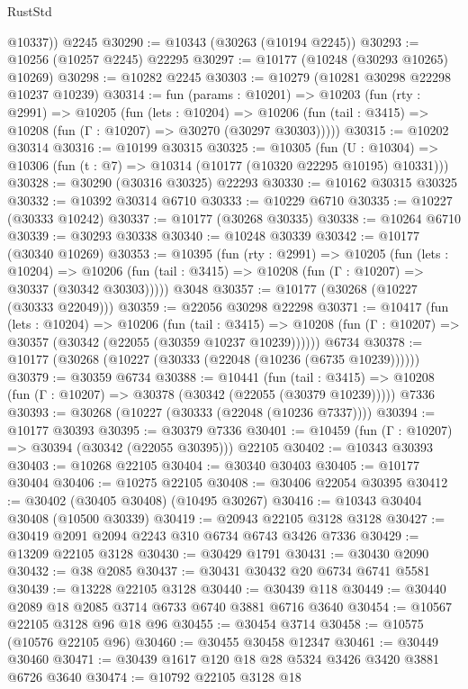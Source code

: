 \begin{lexlean}{RustStd}
\begin{coremodule}
        @10337))
    @2245
@30290 := @10343 (@30263 (@10194 @2245))
@30293 := @10256 (@10257 @2245) @22295
@30297 := @10177 (@10248 (@30293 @10265) @10269)
@30298 := @10282 @2245
@30303 := @10279 (@10281 @30298 @22298 @10237 @10239)
@30314 := fun (params : @10201) =>
  @10203
    (fun (rty : @2991) =>
    @10205
      (fun (lets : @10204) =>
      @10206 (fun (tail : @3415) => @10208 (fun (Γ : @10207) => @30270 (@30297 @30303)))))
@30315 := @10202 @30314
@30316 := @10199 @30315
@30325 := @10305
    (fun (U : @10304) => @10306 (fun (t : @7) => @10314 (@10177 (@10320 @22295 @10195) @10331)))
@30328 := @30290 (@30316 @30325) @22293
@30330 := @10162 @30315 @30325
@30332 := @10392 @30314 @6710
@30333 := @10229 @6710
@30335 := @10227 (@30333 @10242)
@30337 := @10177 (@30268 @30335)
@30338 := @10264 @6710
@30339 := @30293 @30338
@30340 := @10248 @30339
@30342 := @10177 (@30340 @10269)
@30353 := @10395
    (fun (rty : @2991) =>
    @10205
      (fun (lets : @10204) =>
      @10206 (fun (tail : @3415) => @10208 (fun (Γ : @10207) => @30337 (@30342 @30303)))))
    @3048
@30357 := @10177 (@30268 (@10227 (@30333 @22049)))
@30359 := @22056 @30298 @22298
@30371 := @10417
    (fun (lets : @10204) =>
    @10206
      (fun (tail : @3415) =>
      @10208 (fun (Γ : @10207) => @30357 (@30342 (@22055 (@30359 @10237 @10239))))))
    @6734
@30378 := @10177 (@30268 (@10227 (@30333 (@22048 (@10236 (@6735 @10239))))))
@30379 := @30359 @6734
@30388 := @10441
    (fun (tail : @3415) => @10208 (fun (Γ : @10207) => @30378 (@30342 (@22055 (@30379 @10239)))))
    @7336
@30393 := @30268 (@10227 (@30333 (@22048 (@10236 @7337))))
@30394 := @10177 @30393
@30395 := @30379 @7336
@30401 := @10459 (fun (Γ : @10207) => @30394 (@30342 (@22055 @30395))) @22105
@30402 := @10343 @30393
@30403 := @10268 @22105
@30404 := @30340 @30403
@30405 := @10177 @30404
@30406 := @10275 @22105
@30408 := @30406 @22054 @30395
@30412 := @30402 (@30405 @30408) (@10495 @30267)
@30416 := @10343 @30404 @30408 (@10500 @30339)
@30419 := @20943 @22105 @3128 @3128
@30427 := @30419 @2091 @2094 @2243 @310 @6734 @6743 @3426 @7336
@30429 := @13209 @22105 @3128
@30430 := @30429 @1791
@30431 := @30430 @2090
@30432 := @38 @2085
@30437 := @30431 @30432 @20 @6734 @6741 @5581
@30439 := @13228 @22105 @3128
@30440 := @30439 @118
@30449 := @30440 @2089 @18 @2085 @3714 @6733 @6740 @3881 @6716 @3640
@30454 := @10567 @22105 @3128 @96 @18 @96
@30455 := @30454 @3714
@30458 := @10575 (@10576 @22105 @96)
@30460 := @30455 @30458 @12347
@30461 := @30449 @30460
@30471 := @30439 @1617 @120 @18 @28 @5324 @3426 @3420 @3881 @6726 @3640
@30474 := @10792 @22105 @3128 @18

\end{coremodule}
\end{lexlean}
